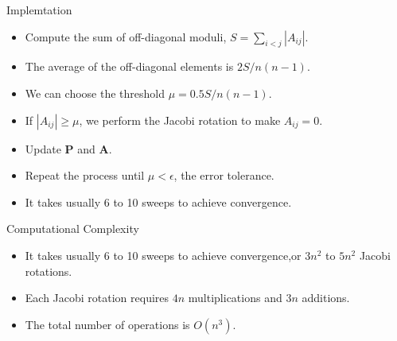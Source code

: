 \documentclass{beamer}
\begin{document}
\begin{frame}{Implemtation}
    \begin{itemize}
        \item Compute the sum of off-diagonal moduli, $S=\sum_{i < j} |A_{i j}|$.
        \item The average of the off-diagonal elements is $2S / n(n-1)$.
        \item We can choose the threshold $\mu=0.5S/n(n-1)$.
        \item If $|A_{i j}|\ge \mu$, we perform the Jacobi rotation to make $A_{i j}=0$.
        \item Update $\mathbf{P}$ and $\mathbf{A}$.
        \item Repeat the process until $\mu <\epsilon$, the error tolerance.
        \item It takes usually 6 to 10 sweeps to achieve convergence.
    \end{itemize}

\end{frame}
\begin{frame}{Computational Complexity}
    \begin{itemize}
        \item It takes usually 6 to 10 sweeps to achieve convergence,or $3n^2$ to $5n^2$ Jacobi rotations.
        \item Each Jacobi rotation requires $4n$ multiplications and $3n$ additions.
        \item  The total number of operations is $O(n^3)$.
    \end{itemize}
\end{frame}
\end{document}
